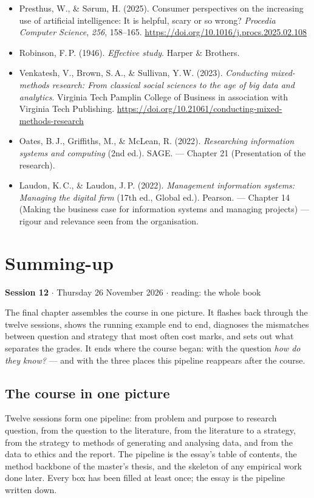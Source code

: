 \documentclass[11pt,a4paper,british,twoside=false,headings=small,chapterprefix=false,numbers=noenddot]{scrbook}
\newcommand{\sessionhead}[2]{\begin{tcolorbox}[enhanced, colback=uiamutedblue, colframe=uiamutedblue, arc=1.5pt, left=6pt, right=6pt]
  \small \textbf{Session #1} \;$\cdot$\; #2\end{tcolorbox}}
\begin{document}
\begin{itemize}
  \item Presthus, W., \& S\o rum, H. (2025). Consumer perspectives on the increasing use of artificial intelligence: It is helpful, scary or so wrong? \emph{Procedia Computer Science}, \emph{256}, 158--165. \url{https://doi.org/10.1016/j.procs.2025.02.108}
  \item Robinson, F.\,P. (1946). \emph{Effective study}. Harper \& Brothers.
  \item Venkatesh, V., Brown, S.\,A., \& Sullivan, Y.\,W. (2023). \emph{Conducting mixed-methods research: From classical social sciences to the age of big data and analytics}. Virginia Tech Pamplin College of Business in association with Virginia Tech Publishing. \url{https://doi.org/10.21061/conducting-mixed-methods-research}
  \item Oates, B.\,J., Griffiths, M., \& McLean, R. (2022). \emph{Researching information systems and computing} (2nd ed.). SAGE. --- Chapter 21 (Presentation of the research).
  \item Laudon, K.\,C., \& Laudon, J.\,P. (2022). \emph{Management information systems: Managing the digital firm} (17th ed., Global ed.). Pearson. --- Chapter 14 (Making the business case for information systems and managing projects) --- rigour and relevance seen from the organisation.
\end{itemize}

\chapter{Summing-up}
\label{ch:12}
\sessionhead{12}{Thursday 26 November 2026 \;$\cdot$\; reading: the whole book}

The final chapter assembles the course in one picture. It flashes back through the twelve sessions, shows the running example end to end, diagnoses the mismatches between question and strategy that most often cost marks, and sets out what separates the grades. It ends where the course began: with the question \emph{how do they know?} --- and with the three places this pipeline reappears after the course.


\section{The course in one picture}

Twelve sessions form one pipeline: from problem and purpose to research question, from the question to the literature, from the literature to a strategy, from the strategy to methods of generating and analysing data, and from the data to ethics and the report. The pipeline is the essay's table of contents, the method backbone of the master's thesis, and the skeleton of any empirical work done later. Every box has been filled at least once; the essay is the pipeline written down.
\end{document}
